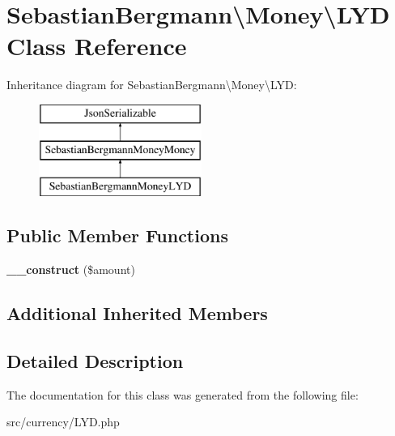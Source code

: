 \hypertarget{classSebastianBergmann_1_1Money_1_1LYD}{}\section{Sebastian\+Bergmann\textbackslash{}Money\textbackslash{}L\+Y\+D Class Reference}
\label{classSebastianBergmann_1_1Money_1_1LYD}
Inheritance diagram for Sebastian\+Bergmann\textbackslash{}Money\textbackslash{}L\+Y\+D\+:\begin{figure}[H]
\begin{center}
\leavevmode
\includegraphics[height=3.000000cm]{classSebastianBergmann_1_1Money_1_1LYD}
\end{center}
\end{figure}
\subsection*{Public Member Functions}
\begin{DoxyCompactItemize}
\item 
\hypertarget{classSebastianBergmann_1_1Money_1_1LYD_a196c9c2b05fb06684d6e3c577cc3c8a4}{}{\bfseries \+\_\+\+\_\+construct} (\$amount)\label{classSebastianBergmann_1_1Money_1_1LYD_a196c9c2b05fb06684d6e3c577cc3c8a4}

\end{DoxyCompactItemize}
\subsection*{Additional Inherited Members}


\subsection{Detailed Description}


The documentation for this class was generated from the following file\+:\begin{DoxyCompactItemize}
\item 
src/currency/L\+Y\+D.\+php\end{DoxyCompactItemize}
